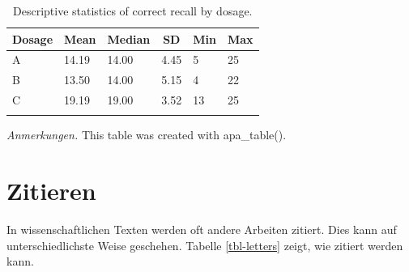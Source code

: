 \documentclass[
  doc,floatsintext]{apa7}
\begin{document}
\begin{table}[tbp]

\begin{center}
\begin{threeparttable}

\caption{\label{tab:mixedtab}Descriptive statistics of correct recall by dosage.}

\begin{tabular}{llllll}
\toprule
Dosage & \multicolumn{1}{c}{Mean} & \multicolumn{1}{c}{Median} & \multicolumn{1}{c}{SD} & \multicolumn{1}{c}{Min} & \multicolumn{1}{c}{Max}\\
\midrule
A & 14.19 & 14.00 & 4.45 & 5 & 25\\
B & 13.50 & 14.00 & 5.15 & 4 & 22\\
C & 19.19 & 19.00 & 3.52 & 13 & 25\\
\bottomrule
\addlinespace
\end{tabular}

\begin{tablenotes}[para]
\normalsize{\textit{Anmerkungen.} This table was created with apa\_table().}
\end{tablenotes}

\end{threeparttable}
\end{center}

\end{table}

\hypertarget{zitieren}{%
\section{Zitieren}\label{zitieren}}

In wissenschaftlichen Texten werden oft andere Arbeiten zitiert. Dies kann auf unterschiedlichste Weise geschehen. Tabelle \ref{tbl-letters} zeigt, wie zitiert werden kann.
\end{document}
